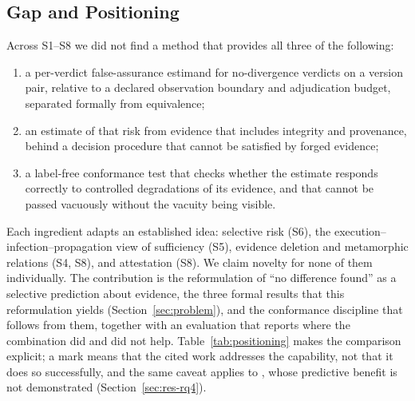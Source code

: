 \subsection{Gap and Positioning}
Across S1--S8 we did not find a method that provides all three of the following:
\begin{enumerate}
\item a per-verdict false-assurance estimand for no-divergence verdicts on a version pair, relative to a declared observation boundary and adjudication budget, separated formally from equivalence;
\item an estimate of that risk from evidence that includes integrity and provenance, behind a decision procedure that cannot be satisfied by forged evidence;
\item a label-free conformance test that checks whether the estimate responds correctly to controlled degradations of its evidence, and that cannot be passed vacuously without the vacuity being visible.
\end{enumerate}
Each ingredient adapts an established idea: selective risk (S6), the execution--infection--propagation view of sufficiency (S5), evidence deletion and metamorphic relations (S4, S8), and attestation (S8). We claim novelty for none of them individually. The contribution is the reformulation of ``no difference found'' as a selective prediction about evidence, the three formal results that this reformulation yields (Section~\ref{sec:problem}), and the conformance discipline that follows from them, together with an evaluation that reports where the combination did and did not help. Table~\ref{tab:positioning} makes the comparison explicit; a mark means that the cited work addresses the capability, not that it does so successfully, and the same caveat applies to \sbg{}, whose predictive benefit is not demonstrated (Section~\ref{sec:res-rq4}).

